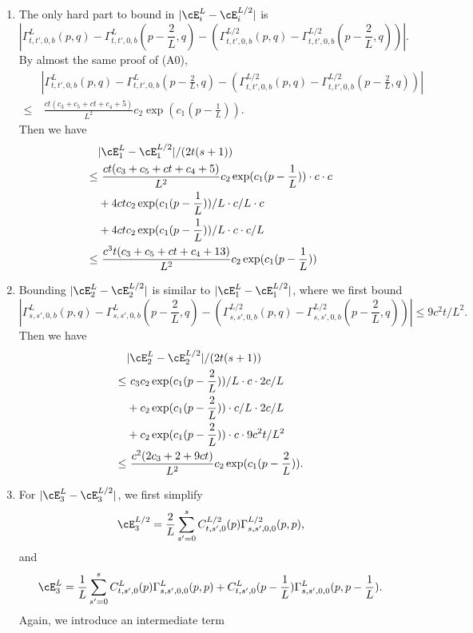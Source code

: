 \begin{enumerate}
    \item The only hard part to bound in $|\cE_i^L-\cE_i^{L/2}|$ is 
    \[|\Gamma^L_{t,t',0,b}(p,q) - \Gamma^L_{t,t',0,b}(p-\frac2L,q) - (\Gamma^{L/2}_{t,t',0,b}(p,q) - \Gamma^{L/2}_{t,t',0,b}(p-\frac2L,q))|.\]
    By almost the same proof of (A0), 
    \begin{align*}
        &|\Gamma^L_{t,t',0,b}(p,q) - \Gamma^L_{t,t',0,b}(p-\frac2L,q) - (\Gamma^{L/2}_{t,t',0,b}(p,q) - \Gamma^{L/2}_{t,t',0,b}(p-\frac2L,q))|\\
        \leq &~ \frac{ct(c_3+c_5+ct+c_4+5)}{L^2} c_2 \exp(c_1(p-\frac1L)).
    \end{align*}
    Then we have 
    \begin{align*}
        & |\cE_1^L-\cE_1^{L/2}| / (2t(s+1))\\
        \leq &~ \frac{ct(c_3+c_5+ct+c_4+5)}{L^2} c_2 \exp(c_1(p-\frac1L))\cdot c\cdot c\\
        & + 4ctc_2\exp(c_1(p-\frac1L))/L\cdot c/L \cdot c \\
        & + 4ctc_2\exp(c_1(p-\frac1L))/L\cdot c\cdot c/L\\
        \leq &~ \frac{c^3t(c_3+c_5+ct+c_4+13)}{L^2} c_2 \exp(c_1(p-\frac1L))
    \end{align*}
    \item Bounding $|\cE_2^L-\cE_2^{L/2}|$ is similar to $|\cE_1^L-\cE_1^{L/2}|$, where we first bound
    \[|\Gamma^L_{s,s',0,b}(p,q) - \Gamma^L_{s,s',0,b}(p-\frac2L,q) - (\Gamma^{L/2}_{s,s',0,b}(p,q) - \Gamma^{L/2}_{s,s',0,b}(p-\frac2L,q))|        \leq 9c^2t/L^2.\]
    Then we have 
    \begin{align*}
        & |\cE_2^L-\cE_2^{L/2}| / (2t(s+1))\\
        \leq &~ c_3c_2\exp(c_1(p-\frac2L))/L\cdot c\cdot 2c/L\\
        & + c_2\exp(c_1(p-\frac2L)) \cdot c / L \cdot 2c/L \\
        & + c_2\exp(c_1(p-\frac2L)) \cdot c \cdot 9c^2t/L^2\\
        \leq &~ \frac{c^2(2c_3+2+9ct)}{L^2} c_2 \exp(c_1(p-\frac2L)).
    \end{align*}
    \item For $|\cE_3^L-\cE_3^{L/2}|$, we first simplify \[\cE_3^{L/2}=\frac2L\sum_{s'=0}^s C_{t,s',0}^{L/2}(p)\Gamma_{s,s',0,0}^{L/2}(p,p), \] and 
    \[\cE_3^{L}=\frac1L\sum_{s'=0}^s C_{t,s',0}^{L}(p)\Gamma_{s,s',0,0}^{L}(p,p) + C_{t,s',0}^{L}(p-\frac1L)\Gamma_{s,s',0,0}^{L}(p,p-\frac1L).\]
    Again, we introduce an intermediate term 

\end{enumerate}
